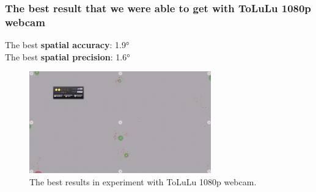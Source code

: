 \documentclass{beamer}
\begin{document}
    \begin{frame}
        \frametitle{The best result that we were able to get with ToLuLu 1080p
        webcam}

        \center
        The best \textbf{spatial accuracy}: \ang{1.9} \\
        The best \textbf{spatial precision}: \ang{1.6}

        \begin{figure}
            \begin{center}
                \includegraphics[width=0.7\textwidth]{Best_res_Tolulu.jpg}
            \end{center}
            \caption{The best results in experiment with ToLuLu 1080p webcam.}
            \label{fig:Best_Tolulu}
        \end{figure}

    \end{frame}
\end{document}

